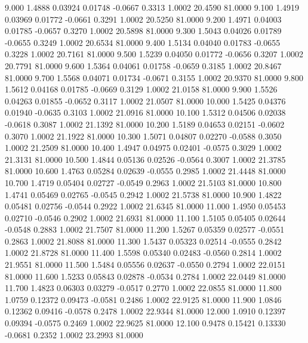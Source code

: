    9.000   1.4888   0.03924   0.01748  -0.0667   0.3313   1.0002  20.4590  81.0000
   9.100   1.4919   0.03969   0.01772  -0.0661   0.3291   1.0002  20.5250  81.0000
   9.200   1.4971   0.04003   0.01785  -0.0657   0.3270   1.0002  20.5898  81.0000
   9.300   1.5043   0.04026   0.01789  -0.0655   0.3249   1.0002  20.6534  81.0000
   9.400   1.5134   0.04040   0.01783  -0.0655   0.3228   1.0002  20.7161  81.0000
   9.500   1.5239   0.04050   0.01772  -0.0656   0.3207   1.0002  20.7791  81.0000
   9.600   1.5364   0.04061   0.01758  -0.0659   0.3185   1.0002  20.8467  81.0000
   9.700   1.5568   0.04071   0.01734  -0.0671   0.3155   1.0002  20.9370  81.0000
   9.800   1.5612   0.04168   0.01785  -0.0669   0.3129   1.0002  21.0158  81.0000
   9.900   1.5526   0.04263   0.01855  -0.0652   0.3117   1.0002  21.0507  81.0000
  10.000   1.5425   0.04376   0.01940  -0.0635   0.3103   1.0002  21.0916  81.0000
  10.100   1.5312   0.04506   0.02038  -0.0618   0.3087   1.0002  21.1392  81.0000
  10.200   1.5189   0.04653   0.02151  -0.0602   0.3070   1.0002  21.1922  81.0000
  10.300   1.5071   0.04807   0.02270  -0.0588   0.3050   1.0002  21.2509  81.0000
  10.400   1.4947   0.04975   0.02401  -0.0575   0.3029   1.0002  21.3131  81.0000
  10.500   1.4844   0.05136   0.02526  -0.0564   0.3007   1.0002  21.3785  81.0000
  10.600   1.4763   0.05284   0.02639  -0.0555   0.2985   1.0002  21.4448  81.0000
  10.700   1.4719   0.05404   0.02727  -0.0549   0.2963   1.0002  21.5103  81.0000
  10.800   1.4741   0.05469   0.02765  -0.0545   0.2942   1.0002  21.5738  81.0000
  10.900   1.4822   0.05481   0.02756  -0.0544   0.2922   1.0002  21.6345  81.0000
  11.000   1.4950   0.05453   0.02710  -0.0546   0.2902   1.0002  21.6931  81.0000
  11.100   1.5105   0.05405   0.02644  -0.0548   0.2883   1.0002  21.7507  81.0000
  11.200   1.5267   0.05359   0.02577  -0.0551   0.2863   1.0002  21.8088  81.0000
  11.300   1.5437   0.05323   0.02514  -0.0555   0.2842   1.0002  21.8728  81.0000
  11.400   1.5598   0.05340   0.02483  -0.0560   0.2814   1.0002  21.9551  81.0000
  11.500   1.5484   0.05556   0.02637  -0.0550   0.2794   1.0002  22.0151  81.0000
  11.600   1.5233   0.05843   0.02878  -0.0534   0.2784   1.0002  22.0449  81.0000
  11.700   1.4823   0.06303   0.03279  -0.0517   0.2770   1.0002  22.0855  81.0000
  11.800   1.0759   0.12372   0.09473  -0.0581   0.2486   1.0002  22.9125  81.0000
  11.900   1.0846   0.12362   0.09416  -0.0578   0.2478   1.0002  22.9344  81.0000
  12.000   1.0910   0.12397   0.09394  -0.0575   0.2469   1.0002  22.9625  81.0000
  12.100   0.9478   0.15421   0.13330  -0.0681   0.2352   1.0002  23.2993  81.0000
